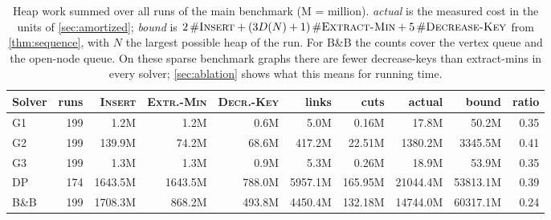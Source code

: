 \begin{table}[!htbp]\centering\small
\begin{tabular}{@{}lrrrrrrrrr@{}}\toprule
Solver & runs & \textsc{Insert} & \textsc{Extr.-Min} & \textsc{Decr.-Key} & links & cuts & actual & bound & ratio\\\midrule
G1 & 199 & 1.2M & 1.2M & 0.6M & 5.0M & 0.16M & 17.8M & 50.2M & 0.35\\
G2 & 199 & 139.9M & 74.2M & 68.6M & 417.2M & 22.51M & 1380.2M & 3345.5M & 0.41\\
G3 & 199 & 1.3M & 1.3M & 0.9M & 5.3M & 0.26M & 18.9M & 53.9M & 0.35\\
DP & 174 & 1643.5M & 1643.5M & 788.0M & 5957.1M & 165.95M & 21044.4M & 53813.1M & 0.39\\
B\&B & 199 & 1708.3M & 868.2M & 493.8M & 4450.4M & 132.18M & 14744.0M & 60317.1M & 0.24\\
\bottomrule\end{tabular}
\caption{Heap work summed over all runs of the main benchmark (M = million). \emph{actual} is the measured cost in the units of \cref{sec:amortized}; \emph{bound} is \(2\,\#\textsc{Insert}+(3D(N)+1)\,\#\textsc{Extract-Min}+5\,\#\textsc{Decrease-Key}\) from \cref{thm:sequence}, with \(N\) the largest possible heap of the run. For B\&B the counts cover the vertex queue and the open-node queue. On these sparse benchmark graphs there are fewer decrease-keys than extract-mins in every solver; \cref{sec:ablation} shows what this means for running time.}\label{tab:heapcounts}
\end{table}
